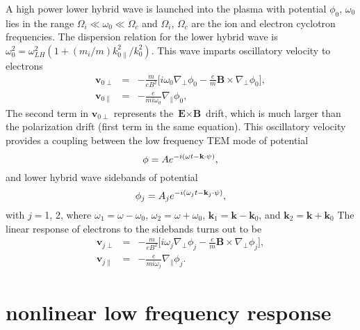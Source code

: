 \documentclass[aip,pop,amsmath,amssymb,showpacs,reprint,floatfix,lengthcheck]{revtex4-1}
\begin{document}
A high power lower hybrid wave is launched into the plasma with potential $\phi_{0}$, $\omega_{0}$ lies in the range $\Omega_{i}\ll\omega_{0}\ll\Omega_{c}$ and $\Omega_{i}$, $\Omega_{c}$ are the ion and electron cyclotron frequencies. The dispersion relation for the lower hybrid wave is $\omega_{0}^2=\omega_{LH}^2(1+(m_{i}/m) k_{0\parallel}^2/k_{0}^2)$. This wave imparts oscillatory velocity to electrons
\begin{eqnarray}
 \textbf{v}_{0\perp}&=&-\frac{m}{eB^2}\biggl[i\omega_{0}\nabla_{\perp}\phi_{0}-\frac{e}{m}\textbf{B}\times\nabla_{\perp}\phi_{0}\biggr],\nonumber\\
\textbf{v}_{0\parallel}&=&-\frac{e}{mi\omega_{0}}\nabla_{\parallel}\phi_{0},
\end{eqnarray}
The second term in $\textbf{v}_{0\perp}$ represents the $\textbf{E}\times \textbf{B}$ drift, which is much larger than the polarization drift (first term in the same equation).
This oscillatory velocity provides a coupling between the low frequency TEM mode of potential
\begin{equation}
 \phi=A e^{-i(\omega t-\textbf k\cdot\psi)},
\end{equation}
and lower hybrid wave sidebands of potential
\begin{equation}
  \phi_{j}=A_{j} e^{-i(\omega_{j} t-\textbf k_{j}\cdot\psi)},
\end{equation}
with $j=$1, 2, where $\omega_{1}=\omega-\omega_{0}$, $\omega_{2}=\omega+\omega_{0}$, $\textbf{k}_{1}=\textbf{k}-\textbf{k}_{0}$, and $\textbf{k}_{2}=\textbf{k}+\textbf{k}_{0}$
The linear response of electrons to the sidebands turns out to be
\begin{eqnarray}
 \textbf{v}_{j\perp}&=&-\frac{m}{eB^2}\biggl[i\omega_{j}\nabla_{\perp}\phi_{j}-\frac{e}{m}\textbf{B}\times\nabla_{\perp}\phi_{j}\biggr],\nonumber\\
\textbf{v}_{j\parallel}&=&-\frac{e}{mi\omega_{j}}\nabla_{\parallel}\phi_{j}.
\end{eqnarray}


\section{nonlinear low frequency response}
\end{document}
